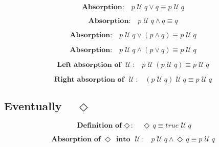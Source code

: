 \documentclass[12pt, fleqn, leqno]{article}
\newcommand{\Until}{\;\mathcal{U}\;}
\newcommand{\Event}{\Diamond\,}
\newcommand{\spacer}{\vspace{-30pt}}
\newcommand{\firstspacer}{\vspace{-26pt}}
\begin{document}
\spacer

\begin{equation}\label{E:untilOrQ}
\textbf{Absorption:}\quad p \Until q \lor q \equiv p \Until q
\end{equation}

\spacer

\begin{equation}\label{E:untilAndQ}
\textbf{Absorption:}\quad p \Until q \land q \equiv q
\end{equation}

\spacer

\begin{equation}\label{E:untilOrAnd}
\textbf{Absorption:}\quad p \Until q \lor (p \land q) \equiv p \Until q
\end{equation}

\spacer

\begin{equation}\label{E:untilAndOr}
\textbf{Absorption:}\quad p \Until q \land (p \lor q) \equiv p \Until q
\end{equation}

\spacer

\begin{equation}\label{E:untilIdem}
\textbf{Left absorption of $\Until$:}\quad p \Until (p \Until q) \equiv p \Until q
\end{equation}

\spacer

\begin{equation}\label{E:untilIdemR}
\textbf{Right absorption of $\Until$:}\quad (p \Until q) \Until q \equiv p \Until q
\end{equation}

\newpage

\subsection*{Eventually $\quad\Event$}

\begin{equation}\label{E:defEvent}
\textbf{Definition of $\Event$:}\quad \Event q \equiv true \Until q
\end{equation}

\firstspacer

\begin{equation}\label{E:absEventIntoUntil}
\textbf{Absorption of $\Event$ into $\Until$:}\quad p \Until q\land \Event q \equiv p\Until q
\end{equation}
\end{document}
